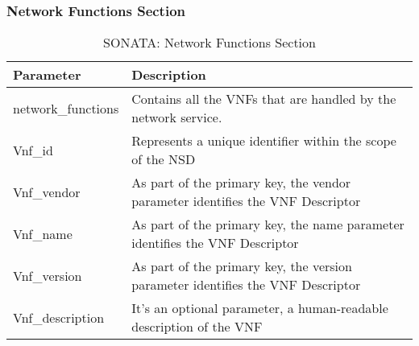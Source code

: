 \subsubsection{Network Functions Section}
    \begin{table}[h]
    \centering
    \begin{tabular}{ |p{4cm}|p{10cm}|}
        \hline
        \textbf{Parameter} & \textbf{Description} \\
        \hline
         
         network\_functions & Contains all the VNFs that are handled by the network service. \\
         \hline
         Vnf\_id & Represents a unique identifier within the scope of the NSD \\
         \hline
         Vnf\_vendor & As part of the primary key, the vendor parameter identifies the VNF Descriptor \\
         \hline
         Vnf\_name & As part of the primary key, the name parameter identifies the VNF Descriptor \\
         \hline
         Vnf\_version & As part of the primary key, the version parameter identifies the VNF Descriptor\\
         \hline
         Vnf\_description & It's an optional parameter, a human-readable description of the VNF\\
         \hline
    \end{tabular}
    \caption{SONATA: Network Functions Section}
    \label{tab:SONATA_NF_section}
 \end{table}

